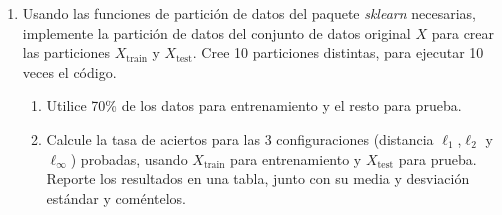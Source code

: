\documentclass{article}
\begin{document}
\begin{enumerate}
\begin{enumerate}
\item Usando las funciones de partición de datos del paquete \emph{sklearn} necesarias, implemente la partición de datos del conjunto de datos original $X$ para crear las particiones $X_{\textrm{train}}$ y $X_{\textrm{test}}$. Cree 10 particiones distintas, para ejecutar 10 veces el código. 
\begin{enumerate}
\item Utilice 70\% de los datos para entrenamiento y el resto para prueba.
\item Calcule la tasa de aciertos para las 3 configuraciones (distancia $\ell_{1}$,$\ell_{2}$ y $\ell_{\infty}$) probadas, usando $X_{\textrm{train}}$
para entrenamiento y $X_{\textrm{test}}$ para prueba. Reporte los resultados en una tabla, junto con su media y desviación estándar y coméntelos.


\end{enumerate}
\end{enumerate}
\end{enumerate}
\end{document}
